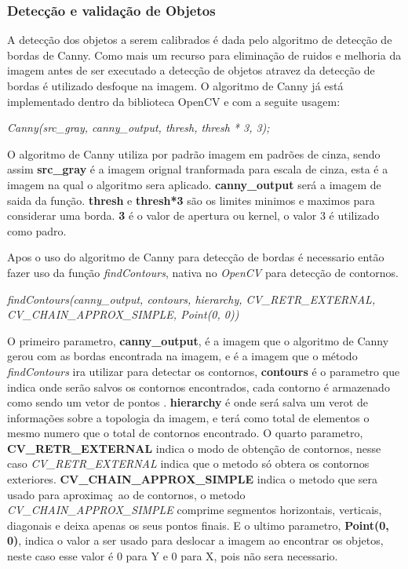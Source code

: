 \subsubsection{Detecção e validação de Objetos}
A detecção dos objetos a serem calibrados é dada pelo algoritmo de detecção de bordas de Canny. Como mais um recurso para eliminação de ruidos e melhoria da imagem antes de ser executado a detecção de objetos atravez da detecção de bordas é utilizado desfoque na imagem. O algoritmo de Canny já está implementado dentro da biblioteca OpenCV e com a seguite usagem:
\begin{center}
\centering \textit{  Canny(src\_gray, canny\_output, thresh, thresh * 3, 3);}
\end{center}
O algoritmo de Canny utiliza por padrão imagem em padrões de cinza, sendo assim \textbf{src\_gray} é a imagem orignal tranformada para escala de cinza, esta é a imagem na qual o algoritmo sera aplicado. \textbf{canny\_output} será a imagem de saida da função.
\textbf{thresh} e \textbf{thresh*3} são os limites minimos e maximos para considerar uma borda. \textbf{3} é o valor de apertura ou kernel, o valor 3 é utilizado como padro.

Apos o uso do algoritmo de Canny para detecção de bordas é necessario então fazer uso da função \textit{findContours}, nativa no \textit{OpenCV} para detecção de contornos.
\begin{center}
\centering \textit{ findContours(canny\_output, contours, hierarchy, CV\_RETR\_EXTERNAL, CV\_CHAIN\_APPROX\_SIMPLE, Point(0, 0))}
\end{center}

O primeiro parametro, \textbf{canny\_output}, é a imagem que o algoritmo de Canny gerou com as bordas encontrada na imagem, e é a imagem que o método \textit{findContours} ira utilizar para detectar os contornos, \textbf{contours} é o parametro que indica onde serão salvos os contornos encontrados, cada contorno é armazenado como sendo um vetor de pontos \cite{OpenCV}. \textbf{hierarchy} é onde será salva um verot de informações sobre a topologia da imagem, e terá como total de elementos o mesmo numero que o total de contornos encontrado\cite{OpenCV}. O quarto parametro, \textbf{CV\_RETR\_EXTERNAL} indica o modo de obtenção de contornos, nesse caso \textit{CV\_RETR\_EXTERNAL} indica que o metodo só obtera os contornos exteriores\cite{OpenCV}. \textbf{CV\_CHAIN\_APPROX\_SIMPLE} indica o metodo que sera usado para aproximaç~ao de contornos, o metodo \textit{CV\_CHAIN\_APPROX\_SIMPLE} comprime segmentos horizontais, verticais, diagonais e deixa apenas os seus pontos finais\cite{OpenCV}. E o ultimo parametro, \textbf{Point(0, 0)}, indica o valor a ser usado para deslocar a imagem ao encontrar os objetos, neste caso esse valor é 0 para Y e 0 para X, pois não sera necessario. 

